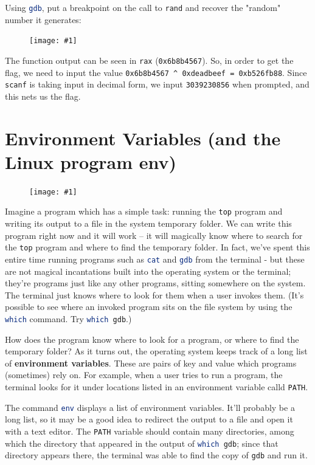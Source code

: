 \documentclass{article}
\newcommand{\displayimage}[1] {
\begin{figure}[H]
    \centering
    \texttt{[image: \#1]} 
\end{figure}
}
\newcommand{\wrapimageright}[1] {
    \begin{figure}
        \begin{center}
            \texttt{[image: \#1]} 
        \end{center}
    \end{figure}
}
\newcommand{\xcode}[2]{\colorbox{ubuntuback}{\lstinline[language=#1]|#2|}}
\newcommand{\asm}[1]{\xcode{{[x86masm]assembler}}{#1}}
\newcommand{\code}[1]{\colorbox{ubuntuback}{\texttt{#1}}}
\begin{document}
Using \xcode{bash}{gdb}, put a breakpoint on the call to \xcode{C}{rand} and recover the "random" number it generates:

\displayimage{./exercises/05_random/random_value.png}

The function output can be seen in \asm{rax} (\code{0x6b8b4567}). So, in order to get the flag, we need to input the value \code{0x6b8b4567 \^{} 0xdeadbeef = 0xb526fb88}. Since \xcode{C}{scanf} is taking input in decimal form, we input \code{3039230856} when prompted, and this nets us the flag. 
\section{Environment Variables (and the Linux program env)}

\wrapimageright{./images/environment.png}
Imagine a program which has a simple task: running the \xcode{bash}{top} program and writing its output to a file in the system temporary folder. We can write this program right now and it will work -- it will magically know where to search for the \xcode{bash}{top} program and where to find the temporary folder. In fact, we've spent this entire time running programs such as \xcode{bash}{cat} and \xcode{bash}{gdb} from the terminal - but these are not magical incantations built into the operating system or the terminal; they're programs just like any other programs, sitting somewhere on the system. The terminal just knows where to look for them when a user invokes them. (It's possible to see where an invoked program sits on the file system by using the \xcode{bash}{which} command. Try \xcode{bash}{which gdb}.)

How does the program know where to look for a program, or where to find the temporary folder? As it turns out, the operating system keeps track of a long list of \textbf{environment variables}. These are pairs of key and value which programs (sometimes) rely on. For example, when a user tries to run a program, the terminal looks for it under locations listed in an environment variable calld \code{PATH}.

The command \xcode{bash}{env} displays a list of environment variables. It'll probably be a long list, so it may be a good idea to redirect the output to a file and open it with a text editor. The \code{PATH} variable should contain many directories, among which the directory that appeared in the output of \xcode{bash}{which gdb}; since that directory appears there, the terminal was able to find the copy of \code{gdb} and run it.
\end{document}
